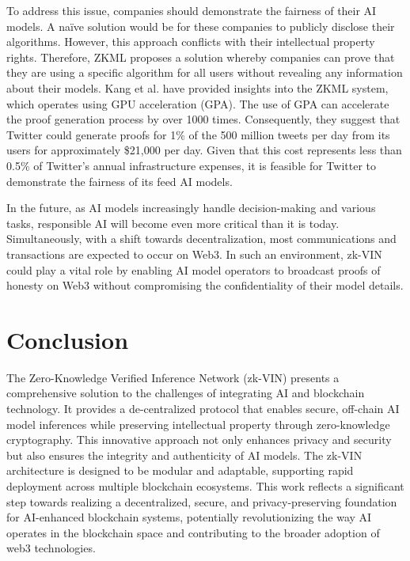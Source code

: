 \documentclass[conference]{IEEEtran}
\begin{document}
To address this issue, companies should demonstrate the fairness of their AI models. A naïve solution would be for these companies to publicly disclose their algorithms. However, this approach conflicts with their intellectual property rights. Therefore, ZKML proposes a solution whereby companies can prove that they are using a specific algorithm for all users without revealing any information about their models. Kang et al.  have provided insights into the ZKML system, which operates using GPU acceleration (GPA). The use of GPA can accelerate the proof generation process by over 1000 times. Consequently, they suggest that Twitter could generate proofs for 1\% of the 500 million tweets per day from its users for approximately \$21,000 per day. Given that this cost represents less than 0.5\% of Twitter's annual infrastructure expenses, it is feasible for Twitter to demonstrate the fairness of its feed AI models.

In the future, as AI models increasingly handle decision-making and various tasks, responsible AI will become even more critical than it is today. Simultaneously, with a shift towards decentralization, most communications and transactions are expected to occur on Web3. In such an environment, zk-VIN could play a vital role by enabling AI model operators to broadcast proofs of honesty on Web3 without compromising the confidentiality of their model details.

\section{Conclusion}
The Zero-Knowledge Veriﬁed Inference Network (zk-VIN) presents a comprehensive solution to the challenges of integrating AI and blockchain technology. It provides a de-centralized protocol that enables secure, off-chain AI model inferences while preserving intellectual property through zero-knowledge cryptography. This innovative approach not only enhances privacy and security but also ensures the integrity and authenticity of AI models. The zk-VIN architecture is designed to be modular and adaptable, supporting rapid deployment across multiple blockchain ecosystems. This work reﬂects a signiﬁcant step towards realizing a decentralized, secure, and privacy-preserving foundation for AI-enhanced blockchain systems, potentially revolutionizing the way AI operates in the blockchain space and contributing to the broader adoption of web3 technologies.
\end{document}
